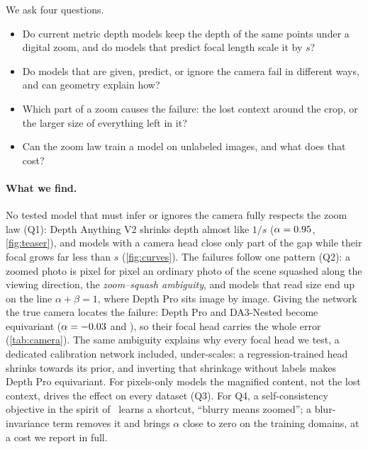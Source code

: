 We ask four questions.
\begin{itemize}\setlength{\itemsep}{0pt}
  \item[\textbf{Q1}] Do current metric depth models keep the depth of the same points under a digital
        zoom, and do models that predict focal length scale it by $s$?
  \item[\textbf{Q2}] Do models that are given, predict, or ignore the camera fail in different ways, and
        can geometry explain how?
  \item[\textbf{Q3}] Which part of a zoom causes the failure: the lost context around the crop, or the
        larger size of everything left in it?
  \item[\textbf{Q4}] Can the zoom law train a model on unlabeled images, and what does that cost?
\end{itemize}

\paragraph{What we find.}
No tested model that must infer or ignores the camera fully respects the zoom law (Q1): Depth Anything V2
shrinks depth almost like $1/s$ ($\alpha=0.95$, \cref{fig:teaser}), and models with a camera head close only part of the
gap while their focal grows far less than $s$ (\cref{fig:curves}). The failures follow one pattern (Q2): a
zoomed photo is pixel for pixel an ordinary photo of the scene squashed along the viewing direction, the
\emph{zoom--squash ambiguity}, and models that read size end up on the line $\alpha+\beta=1$, where Depth Pro
sits image by image. Giving the network the true camera locates the failure: Depth Pro and DA3-Nested become
equivariant ($\alpha=-0.03$ and \DaThreeNestedCamGivenAlpha), so their focal head carries the
whole error (\cref{tab:camera}). The same ambiguity explains why every focal head we test, a dedicated
calibration network included, under-scales: a regression-trained head shrinks towards its prior, and inverting
that shrinkage without labels makes Depth Pro equivariant. For pixels-only models the magnified content, not the lost context, drives the
effect on every dataset (Q3). For Q4, a self-consistency objective in the spirit of~\cite{zhong2023equivariance}
learns a shortcut, ``blurry means zoomed''; a blur-invariance term removes it and brings $\alpha$ close to zero
on the training domains, at a cost we report in full.

